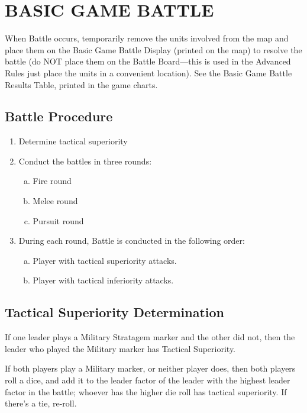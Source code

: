 \section{BASIC GAME BATTLE}

When Battle occurs, temporarily remove the units involved from the map and place them on the Basic Game Battle Display (printed on the map) to resolve the battle (do NOT place them on the Battle Board—this is used in the Advanced Rules just place the units in a convenient location). See the Basic Game Battle Results Table, printed in the game charts.

\subsection{Battle Procedure}

\begin{enumerate}[1.]
  \setlength{\itemsep}{-0.7em}
  \item Determine tactical superiority
  \item Conduct the battles in three rounds:
 \begin{enumerate}[a.]
   \setlength{\itemsep}{-0.9em}
   \item Fire round
   \item Melee round
   \item Pursuit round
 \end{enumerate}
  \item During each round, Battle is conducted in the following order:
  \begin{enumerate}[a.]
    \setlength{\itemsep}{-0.9em}
    \item Player with tactical superiority attacks.
    \item Player with tactical inferiority attacks.
  \end{enumerate}
\end{enumerate}

\subsection{Tactical Superiority Determination}

If one leader plays a Military Stratagem marker and the other did not, then the leader who played the Military marker has Tactical Superiority.

If both players play a Military marker, or neither player does, then both players roll a dice, and add it to the leader factor of the leader with the highest leader factor in the battle; whoever has the higher die roll has tactical superiority. If there’s a tie, re-roll.

